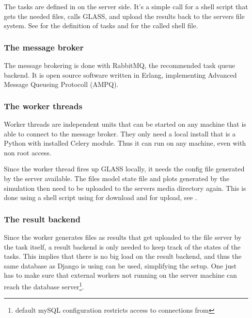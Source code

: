 
The tasks are defined in  on the server side.
It's a simple call for a shell script that gets the needed files, calls GLASS, and upload the results back to the servers file system.
See  for the definition of tasks and  for the called shell file.



\subsubsection{The message broker}

The message brokering is done with RabbitMQ, the recommended task queue backend.
It is open source software written in Erlang, implementing Advanced Message Queueing Protocoll (AMPQ).

\subsubsection{The worker threads}

Worker threads are independent units that can be started on any machine that is able to connect to the message broker. They only need a local install that is a Python with installed Celery module.
Thus it can run on any machine, even with non root access.

Since the worker thread fires up GLASS locally, it needs the config file generated by the server available. The files model state file and plots generated by the simulation then need to be uploaded to the servers media directory again.
This is done using a shell script using  for download and  for upload, see .




\subsubsection{The result backend}
Since the worker generates files as results that get uploaded to the file server by the task itself, a result backend is only needed to keep track of the states of the tasks.
This implies that there is no big load on the result backend, and thus the same database as Django is using can be used, simplifying the setup.
One just has to make sure that external workers not running on the server machine can reach the database server\footnote{default mySQL configuration restricts access to connections from }.




